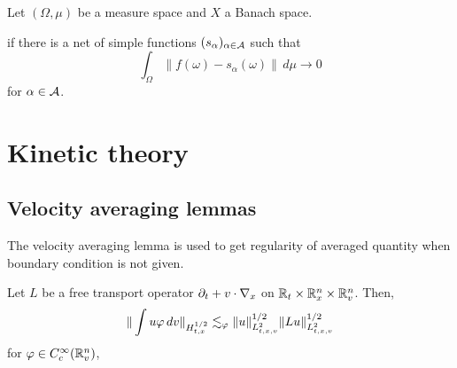 \documentclass[a4paper]{article}
\begin{document}
\begin{prb}
Let $(\Omega,\mu)$ be a measure space and $X$ a Banach space.

if there is a net of simple functions $(s_\alpha)_{\alpha\in\mathcal{A}}$ such that
\[\int_\Omega\|f(\omega)-s_\alpha(\omega)\|\,d\mu\to0\]
for $\alpha\in\mathcal{A}$.
\end{prb}





\newpage
\section{Kinetic theory}
\subsection{Velocity averaging lemmas}
The velocity averaging lemma is used to get regularity of averaged quantity when boundary condition is not given.
\begin{thm}
Let $L$ be a free transport operator $\pd_t+v\cdot\nabla_x$ on $\mathbb{R}_t\times\mathbb{R}_x^n\times\mathbb{R}_v^n$.
Then,
\[\|\int u\varphi\,dv\|_{H_{t,x}^{1/2}}\lesssim_\varphi\|u\|_{L_{t,x,v}^2}^{1/2}\|Lu\|_{L_{t,x,v}^2}^{1/2}\]
for $\varphi\in C_c^\infty(\mathbb{R}_v^n)$,
\end{thm}
\end{document}
